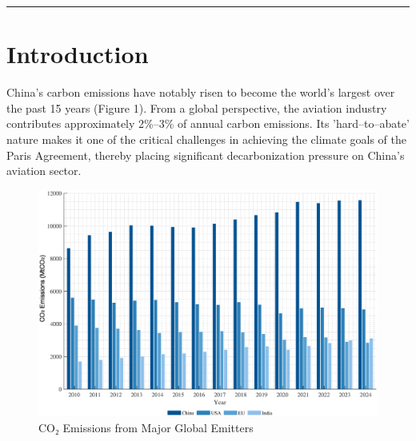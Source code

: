 \documentclass[a4paper,11pt]{article}
\begin{document}
\vspace{1em}
\hrule
\vspace{1.5em}



\section{Introduction}
China's carbon emissions have notably risen to become the world's largest over the past 15 years (Figure 1). From a global perspective, the aviation industry contributes approximately 2\%--3\% of annual carbon emissions. Its 'hard--to--abate' nature makes it one of the critical challenges in achieving the climate goals of the Paris Agreement, thereby placing significant decarbonization pressure on China's aviation sector.\\



\begin{figure}[htbp]
    \centering
    \includegraphics[width=0.9\linewidth]{global_co2_emissions.eps}
    \caption{CO₂ Emissions from Major Global Emitters}
    \label{fig:co2_emissions}
\end{figure}
\end{document}
